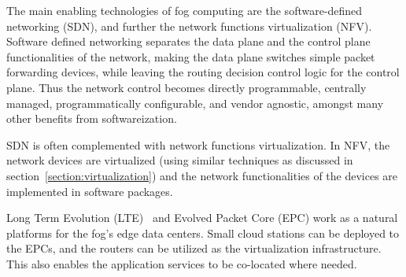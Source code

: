 The main enabling technologies of fog computing are the software-defined networking (SDN), and further the network functions virtualization (NFV). Software defined networking separates the data plane and the control plane functionalities of the network, making the data plane switches simple packet forwarding devices, while leaving the routing decision control logic for the control plane. Thus the network control becomes directly programmable, centrally managed, programmatically configurable, and vendor agnostic, amongst many other benefits from softwareization.~\cite{Kim:2013:SDN}

SDN is often complemented with network functions virtualization. In NFV, the network devices are virtualized (using similar techniques as discussed in section~\ref{section:virtualization}) and the network functionalities of the devices are implemented in software packages.~\cite{Demestichas:2013:NFV}

Long Term Evolution (LTE)~\cite{Sesia:2009:LTE} and Evolved Packet Core (EPC) work as a natural platforms for the fog's edge data centers. Small cloud stations can be deployed to the EPCs, and the routers can be utilized as the virtualization infrastructure. This also enables the application services to be co-located where needed.~\cite{Vaquero:2014:FYW}


